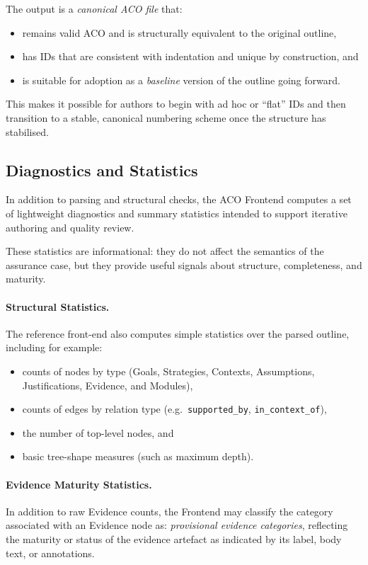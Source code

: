 \documentclass[11pt]{article}
\begin{document}
The output is a \emph{canonical ACO file} that:
\begin{itemize}[leftmargin=2em]
  \item remains valid ACO and is structurally equivalent to the original outline,
  \item has IDs that are consistent with indentation and unique by construction, and
  \item is suitable for adoption as a \emph{baseline} version of the outline going forward.
\end{itemize}

This makes it possible for authors to begin with ad hoc or ``flat'' IDs and then transition to a stable, canonical numbering scheme once the structure has stabilised.

\subsection{Diagnostics and Statistics}
\label{sec:diagnostics}

In addition to parsing and structural checks, the ACO Frontend computes a set of
lightweight diagnostics and summary statistics intended to support iterative
authoring and quality review.

These statistics are informational: they do not affect the semantics of the
assurance case, but they provide useful signals about structure, completeness,
and maturity.

\paragraph{Structural Statistics.}
The reference front-end also computes simple statistics over the parsed outline,
including for example:
\begin{itemize}[leftmargin=2em]
  \item counts of nodes by type (Goals, Strategies, Contexts, Assumptions,
        Justifications, Evidence, and Modules),
  \item counts of edges by relation type (e.g.\ \texttt{supported\_by},
        \texttt{in\_context\_of}),
  \item the number of top-level nodes, and
  \item basic tree-shape measures (such as maximum depth).
\end{itemize}

\paragraph{Evidence Maturity Statistics.}
In addition to raw Evidence counts, the Frontend may classify the category associated with an Evidence node as:
\emph{provisional evidence categories}, reflecting the maturity or status of the
evidence artefact as indicated by its label, body text, or annotations.
\end{document}
